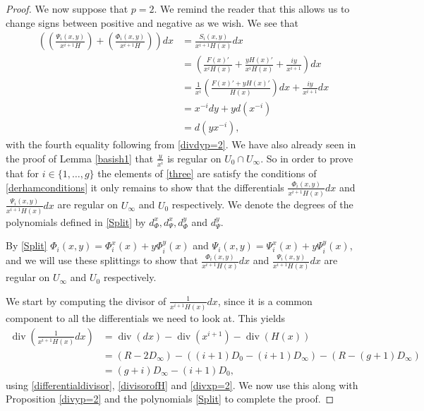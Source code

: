 \documentclass[11pt]{article} %
\theoremstyle{plain}
\theoremstyle{remark}
\DeclareMathOperator{\di}{div}
\begin{document}
\begin{proof}
We now suppose that $p=2$.
We remind the reader that this allows us to change signs between positive and negative as we wish.
We see that
\begin{align*}
\left( \left( \frac{ \Psi_i(x,y)}{x^{i+1}H} \right) + \left( \frac{\Phi_i(x,y)}{x^{i+1}H} \right) \right) dx & =  \frac{S_i(x,y)}{x^{i+1}H(x)}dx \\
& =  \left( \frac{F(x)'}{x^iH(x)} + \frac{yH(x)'}{x^iH(x)} + \frac{iy}{x^{i+1}} \right) dx \\
& =  \frac{1}{x^i}\left( \frac{F(x)' + yH(x)'}{H(x)} \right) dx + \frac{iy}{x^{i+1}}dx \\
& =  x^{-i}dy + yd \left( x^{-i}\right) \\
& =  d\left( yx^{-i}\right),
\end{align*}
with the fourth equality following from \eqref{divdyp=2}.
We have also already seen in the proof of Lemma \ref{basish1} that $\frac{y}{x^i}$ is regular on $U_0 \cap U_\infty$.
So in order to prove that for $i\in \{1, \ldots, g\}$ the elements of \eqref{three} are satisfy the conditions of \eqref{derhamconditions} it only remains to show that the differentials $\frac{\Phi_i(x,y)}{x^{i+1}H(x)}dx$ and $\frac{\Psi_i(x,y)}{x^{i+1}H(x)}dx$ are regular on $U_\infty$ and $U_0$ respectively.
We denote the degrees of the polynomials defined in \eqref{Split} by $d_{\Phi}^x, d_{\Psi}^x, d_{\Phi}^y$ and $d_{\Psi}^y$.


By \eqref{Split} $\Phi_i(x,y) = \Phi_i^x(x) + y\Phi_i^y(x)$ and $\Psi_i (x,y)= \Psi_i^x(x) + y\Psi_i^y(x)$, and we will use these splittings to show that $\frac{ \Phi_i(x,y) }{x^{i+1}H(x)}dx$ and $\frac{\Psi_i(x,y) }{x^{i+1}H(x)}dx$ are regular on $U_\infty$ and $U_0$ respectively.

We start by computing the divisor of $\frac{1}{x^{i+1}H(x)}dx$, since it is a common component to all the differentials we need to look at.
This yields
\begin{align*}
\di \left( \frac{1}{x^{i+1}H(x)}dx \right) & = \di(dx) - \di (x^{i+1}) - \di (H(x)) \nonumber \\
& = (R-2D_\infty) - ((i+1)D_0 - (i+1)D_\infty) - (R - (g+1)D_\infty) \nonumber \\
& = (g+i)D_\infty - (i+1)D_0,
\end{align*}
using \eqref{differentialdivisor}, \eqref{divisorofH} and \eqref{divxp=2}.
We now use this along with Proposition \ref{divyp=2} and the polynomials \eqref{Split} to complete the proof.


\end{proof}
\end{document}
